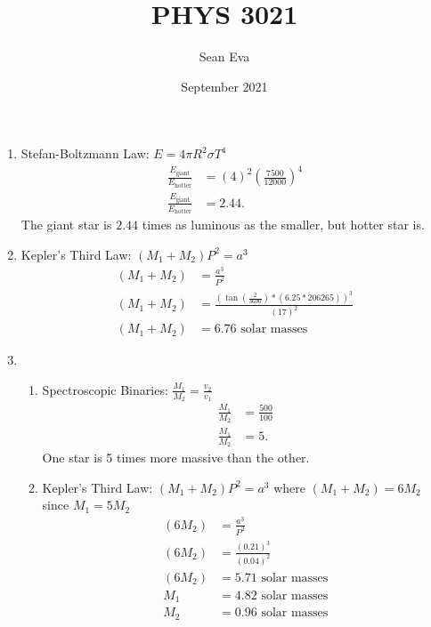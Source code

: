 \documentclass{article}
\title{PHYS 3021}
\author{Sean Eva}
\date{September 2021}
\begin{document}
\maketitle

\begin{enumerate}
    \item 
    
    Stefan-Boltzmann Law: $E=4\pi R^2 \sigma T^4$
    \begin{align*}
        \frac{E_{\text{giant}}}{E_{\text{hotter}}} &= (4)^2(\frac{7500}{12000})^4\\
        \frac{E_{\text{giant}}}{E_{\text{hotter}}} &= 2.44.
    \end{align*} The giant star is $2.44$ times as luminous as the smaller, but hotter star is.
    
    \item
    
    Kepler's Third Law: $(M_1+M_2)P^2 = a^3$
    \begin{align*}
        (M_1+M_2) &= \frac{a^3}{P^2}\\
        (M_1+M_2) &= \frac{(\tan(\frac{2}{3600})*(6.25*206265))^3}{(17)^2}\\
        (M_1+M_2) &= 6.76\text{ solar masses}
    \end{align*}
    
    \item
    
    \begin{enumerate}
        \item 
        
        Spectroscopic Binaries: $\frac{M_1}{M_2}=\frac{v_2}{v_1}$
        \begin{align*}
            \frac{M_1}{M_2} &= \frac{500}{100}\\
            \frac{M_1}{M_2} &= 5.
        \end{align*} One star is 5 times more massive than the other.
        
        \item
        
        Kepler's Third Law: $(M_1+M_2)P^2 = a^3$ where $(M_1+M_2)=6M_2$ since $M_1=5M_2$
        \begin{align*}
            (6M_2) &= \frac{a^3}{P^2}\\
            (6M_2) &= \frac{(0.21)^3}{(0.04)^2}\\
            (6M_2) &= 5.71 \text{ solar masses}\\
            M_1 &= 4.82 \text{ solar masses}\\
            M_2 &= 0.96 \text{ solar masses}
        \end{align*}
        

\end{enumerate}
\end{enumerate}
\end{document}

